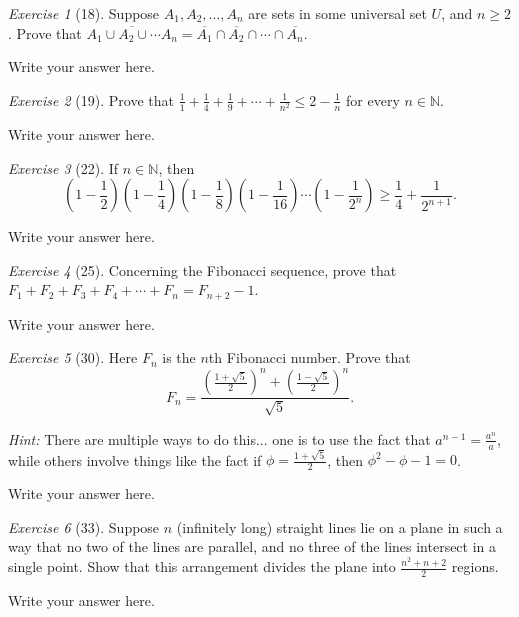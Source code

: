 \documentclass[12pt]{amsart}
\makeatletter
\theoremstyle{remark}
\newtheorem*{exercise}{Exercise}%
\def\NN{\ensuremath{\mathbb N}}
\renewenvironment{proof}[1][\proofname]{\par\doublespacing
  \pushQED{\qed}%
  \normalfont \topsep6\p@\@plus6\p@\relax
  \list{}{%
    \settowidth{\leftmargin}{\itshape\proofname:\hskip\labelsep}%
    \setlength{\labelwidth}{0pt}%
    \setlength{\itemindent}{-\leftmargin}%
  }%
  \item[\hskip\labelsep\itshape#1\@addpunct{:}]\ignorespaces
}{%
  \popQED\endlist\@endpefalse
  \singlespacing
}
\theoremstyle{mycomment}
\makeatother
\begin{document}
\begin{exercise}[18] Suppose $A_{1},A_{2},\ldots, A_{n}$ are sets in some universal set $U$, and $n\ge 2$. Prove that $\overline{A_{1}\cup A_{2}\cup \cdots A_{n}}=\overline{A_{1}}\cap\overline{A_{2}}\cap\cdots \cap\overline{A_{n}}$.
\begin{proof}
Write your answer here.
\end{proof}
\end{exercise}

\begin{exercise}[19] Prove that $\displaystyle \frac{1}{1}+\frac{1}{4}+\frac{1}{9}+\cdots+\frac{1}{n^{2}}\le 2-\frac{1}{n}$ for every $n\in\NN$.
\begin{proof}
Write your answer here.
\end{proof}
\end{exercise}

\begin{exercise}[22] If $n\in\NN$, then $$\left(1-\frac{1}{2}\right)\left(1-\frac{1}{4}\right)\left(1-\frac{1}{8}\right)\left(1-\frac{1}{16}\right)\cdots\left(1-\frac{1}{2^{n}}\right)\ge \frac{1}{4}+\frac{1}{2^{n+1}}.$$
\begin{proof}
Write your answer here.
\end{proof}
\end{exercise}

\begin{exercise}[25] Concerning the Fibonacci sequence, prove that $F_{1}+F_{2}+F_{3}+F_{4}+\cdots+F_{n}=F_{n+2}-1$.
\begin{proof}
Write your answer here.
\end{proof}
\end{exercise}


\begin{exercise}[30] Here $F_{n}$ is the $n$th Fibonacci number. Prove that $$F_{n}=\frac{\left(\frac{1+\sqrt{5}}{2}\right)^{n}+\left(\frac{1-\sqrt{5}}{2}\right)^{n}}{\sqrt{5}}.$$

\emph{Hint:} There are multiple ways to do this... one is to use the fact that $a^{n-1}=\frac{a^{n}}{a}$, while others involve things like the fact if $\phi=\frac{1+\sqrt{5}}{2}$, then $\phi^{2}-\phi-1=0$.
\begin{proof}
Write your answer here.
\end{proof}
\end{exercise}

\begin{exercise}[33] Suppose $n$ (infinitely long) straight lines lie on a plane in such a way that no two of the lines are parallel, and no three of the lines intersect in a single point. Show that this arrangement divides the plane into $\frac{n^{2}+n+2}{2}$ regions.
\begin{proof}
Write your answer here.
\end{proof}
\end{exercise}
\end{document}
